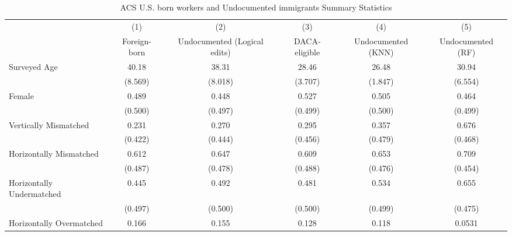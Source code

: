\begin{table}[htbp]\centering
\def\sym#1{\ifmmode^{#1}\else\(^{#1}\)\fi}
\caption{ACS U.S. born workers and Undocumented immigrants Summary Statistics \label{tab:sum}}
\begin{tabular}{l*{5}{c}}
\hline\hline
                    &\multicolumn{1}{c}{(1)}         &\multicolumn{1}{c}{(2)}         &\multicolumn{1}{c}{(3)}         &\multicolumn{1}{c}{(4)}         &\multicolumn{1}{c}{(5)}         \\
                    &Foreign-born         &Undocumented (Logical edits)         &DACA-eligible         &Undocumented (KNN)         &Undocumented (RF)         \\
\hline
Surveyed Age        &       40.18         &       38.31         &       28.46         &       26.48         &       30.94         \\
                    &     (8.569)         &     (8.018)         &     (3.707)         &     (1.847)         &     (6.554)         \\
[1em]
Female              &       0.489         &       0.448         &       0.527         &       0.505         &       0.464         \\
                    &     (0.500)         &     (0.497)         &     (0.499)         &     (0.500)         &     (0.499)         \\
[1em]
Vertically Mismatched&       0.231         &       0.270         &       0.295         &       0.357         &       0.676         \\
                    &     (0.422)         &     (0.444)         &     (0.456)         &     (0.479)         &     (0.468)         \\
[1em]
Horizontally Mismatched&       0.612         &       0.647         &       0.609         &       0.653         &       0.709         \\
                    &     (0.487)         &     (0.478)         &     (0.488)         &     (0.476)         &     (0.454)         \\
[1em]
Horizontally Undermatched&       0.445         &       0.492         &       0.481         &       0.534         &       0.655         \\
                    &     (0.497)         &     (0.500)         &     (0.500)         &     (0.499)         &     (0.475)         \\
[1em]
Horizontally Overmatched&       0.166         &       0.155         &       0.128         &       0.118         &      0.0531         \\

\end{tabular}
\end{table}
